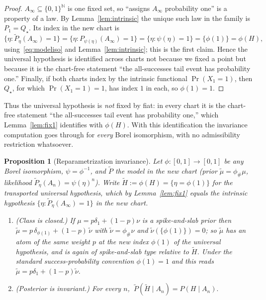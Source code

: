 \documentclass{amsart}
\newtheorem{proposition}{Proposition}
\theoremstyle{definition}
\newcommand{\N}{\mathbb{N}}
\begin{document}
\begin{proof}
$A_\infty\subseteq\{0,1\}^\N$ is one fixed set, so ``assigns $A_\infty$
probability one'' is a property of a law. By Lemma~\ref{lem:intrinsic} the unique
such law in the family is $P_1=Q_\star$. Its index in the new chart is
\[
  \{\eta:\tilde P_\eta(A_\infty)=1\}
  =\{\eta:P_{\psi(\eta)}(A_\infty)=1\}
  =\{\eta:\psi(\eta)=1\}=\{\phi(1)\}=\phi(H),
\]
using~\eqref{eq:modeliso} and Lemma~\ref{lem:intrinsic}; this is the first claim.
Hence the universal hypothesis is identified across charts not because we fixed a
point but because it is the chart-free statement ``the all-successes tail event
has probability one.'' Finally, if both charts index by the intrinsic functional
$\Pr(X_1=1)$, then $Q_\star$, for which $\Pr(X_1=1)=1$, has index $1$ in each, so
$\phi(1)=1$.
\end{proof}

Thus the universal hypothesis is \emph{not} fixed by fiat: in every chart it is
the chart-free statement ``the all-successes tail event has probability one,''
which Lemma~\ref{lem:fix1} identifies with $\phi(H)$. With this identification the
invariance computation goes through for \emph{every} Borel isomorphism, with no
admissibility restriction whatsoever.

\begin{proposition}[Reparametrization invariance]\label{prop:invariance}
Let $\phi:[0,1]\to[0,1]$ be \emph{any} Borel isomorphism, $\psi=\phi^{-1}$, and
$\tilde P$ the model in the new chart (prior $\tilde\mu=\phi_\#\mu$, likelihood
$\tilde P_\eta(A_n)=\psi(\eta)^n$). Write $\tilde H:=\phi(H)=\{\eta=\phi(1)\}$ for
the transported universal hypothesis, which by Lemma~\ref{lem:fix1} equals the
intrinsic hypothesis $\{\eta:\tilde P_\eta(A_\infty)=1\}$ in the new chart.
\begin{enumerate}
\item[\textup{(a)}] \textup{(Class is closed.)} If $\mu=p\delta_1+(1-p)\nu$ is a
spike-and-slab prior then $\tilde\mu=p\,\delta_{\phi(1)}+(1-p)\,\tilde\nu$ with
$\tilde\nu=\phi_\#\nu$ and $\tilde\nu(\{\phi(1)\})=0$; so $\tilde\mu$ has an atom
of the \emph{same} weight $p$ at the new index $\phi(1)$ of the universal
hypothesis, and is again of spike-and-slab type relative to $\tilde H$. Under the
standard success-probability convention $\phi(1)=1$ and this reads
$\tilde\mu=p\delta_1+(1-p)\tilde\nu$.
\item[\textup{(b)}] \textup{(Posterior is invariant.)} For every $n$,
$\ \tilde P(\tilde H\mid A_n)=P(H\mid A_n).$
\end{enumerate}
\end{proposition}
\end{document}
